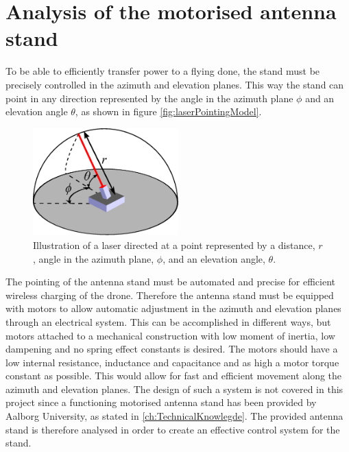 \section{Analysis of the motorised antenna stand}\label{sec:AnalysisMotorisedStand}
To be able to efficiently transfer power to a flying done, the stand must be precisely controlled in the azimuth and elevation planes. This way the stand can point in any direction represented by the angle in the azimuth plane $\phi$ and an elevation angle $\theta$, as shown in figure \autoref{fig:laserPointingModel}.
\begin{figure}[h!]
\centering
\includegraphics[width=0.5\textwidth]{figures/technical/antennaStandModel}
\caption{Illustration of a laser directed at a point represented by a distance, $r$, angle in the azimuth plane, $\phi$, and an elevation angle, $\theta$.}\label{fig:laserPointingModel}
\end{figure}

The pointing of the antenna stand must be automated and precise for efficient wireless charging of the drone. Therefore the antenna stand must be equipped with motors to allow automatic adjustment in the azimuth and elevation planes through an electrical system. This can be accomplished in different ways, but motors attached to a mechanical construction with low moment of inertia, low dampening and no spring effect constants is desired. The motors should have a low internal resistance, inductance and capacitance and as high a motor torque constant as possible. This would allow for fast and efficient movement along the azimuth and elevation planes. The design of such a system is not covered in this project since a functioning motorised antenna stand has been provided by Aalborg University, as stated in \autoref{ch:TechnicalKnowlegde}. The provided antenna stand is therefore analysed in order to create an effective control system for the stand.

